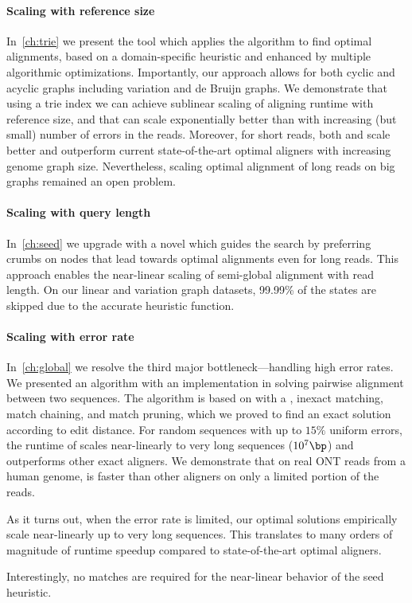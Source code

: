 \paragraph{Scaling with reference size}
In~\cref{ch:trie} we present the tool \astarix which applies the \A algorithm to
find optimal alignments, based on a domain-specific heuristic and enhanced by
multiple algorithmic optimizations. Importantly, our approach allows for both
cyclic and acyclic graphs including variation and de Bruijn graphs. We
demonstrate that using a trie index we can achieve sublinear scaling of aligning
runtime with reference size, and that \A can scale exponentially better than
\dijkstra with increasing (but small) number of errors in the reads. Moreover,
for short reads, both \astarix and \dijkstra scale better and outperform current
state-of-the-art optimal aligners with increasing genome graph size.
Nevertheless, scaling optimal alignment of long reads on big graphs remained an
open problem.

\paragraph{Scaling with query length}
In~\cref{ch:seed} we upgrade \astarix with a novel \sh which guides the \A
search by preferring crumbs on nodes that lead towards optimal alignments even
for long reads. This approach enables the near-linear scaling of semi-global
alignment with read length. On our linear and variation graph datasets, 99.99\%
of the states are skipped due to the accurate heuristic function.

\paragraph{Scaling with error rate}
In~\cref{ch:global} we resolve the third major bottleneck---handling high error
rates. We presented an algorithm with an implementation in \astarpa solving
pairwise alignment between two sequences. The algorithm is based on \A with a
\sh, inexact matching, match chaining, and match pruning, which we proved to
find an exact solution according to edit distance. For random sequences with up
to $15\%$ uniform errors, the runtime of \astarpa scales near-linearly to very
long sequences ($10^7\bp$) and outperforms other exact aligners. We demonstrate
that on real ONT reads from a human genome, \astarpa is faster than other
aligners on only a limited portion of the reads.

As it turns out, when the error rate is limited, our optimal solutions
empirically scale near-linearly up to very long sequences. This translates to
many orders of magnitude of runtime speedup compared to state-of-the-art optimal
aligners.

Interestingly, no matches are required for the near-linear behavior of the seed
heuristic.
